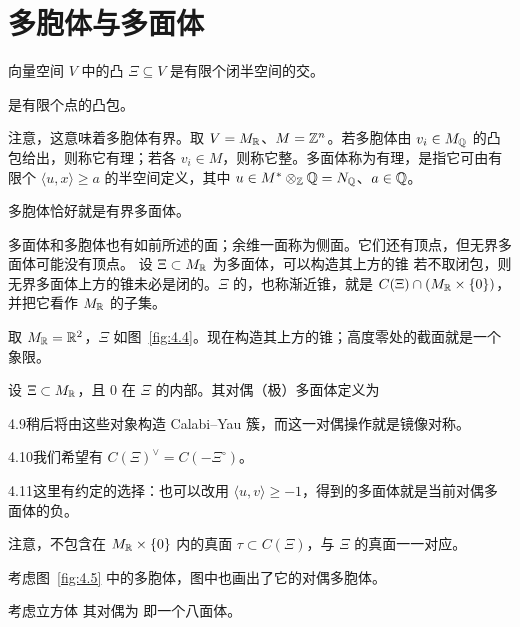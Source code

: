 \section{多胞体与多面体}
\begin{definition}\label{def:4.12}
向量空间 $V$ 中的凸 $\Xi\subseteq V$ 是有限个闭半空间的交。
\end{definition}
\begin{definition}\label{def:4.13}
是有限个点的凸包。
\end{definition}
注意，这意味着多胞体有界。取 $V=M_{\mathbb R}$、$M=\mathbb Z^n$。若多胞体由 $v_i\in M_{\mathbb Q}$ 的凸包给出，则称它有理；若各 $v_i\in M$，则称它整。多面体称为有理，是指它可由有限个 $\langle u,x\rangle\ge a$ 的半空间定义，其中 $u\in M^*\otimes_{\mathbb Z}\mathbb Q=N_{\mathbb Q}$、$a\in\mathbb Q$。
\begin{theorem}\label{thm:4.11}
多胞体恰好就是有界多面体。
\end{theorem}
多面体和多胞体也有如前所述的面；余维一面称为侧面。它们还有顶点，但无界多面体可能没有顶点。
设 $\Xi\subset M_{\mathbb R}$ 为多面体，可以构造其上方的锥
若不取闭包，则无界多面体上方的锥未必是闭的。$\Xi$ 的，也称渐近锥，就是 $C(\Xi)\cap(M_{\mathbb R}\times\{0\})$，并把它看作 $M_{\mathbb R}$ 的子集。
\begin{example}\label{ex:4.21}
取 $M_{\mathbb R}=\mathbb R^2$，$\Xi$ 如图~\ref{fig:4.4}。现在构造其上方的锥；高度零处的截面就是一个象限。
\end{example}
\begin{definition}[对偶多胞体与多面体]\label{def:4.14}
设 $\Xi\subset M_{\mathbb R}$，且 $0$ 在 $\Xi$ 的内部。其对偶（极）多面体定义为
\end{definition}
\begin{Note}{4.9}稍后将由这些对象构造 Calabi–Yau 簇，而这一对偶操作就是镜像对称。\end{Note}
\begin{Note}{4.10}我们希望有 $C(\Xi)^\vee=C(-\Xi^\circ)$。\end{Note}
\begin{Note}{4.11}这里有约定的选择：也可以改用 $\langle u,v\rangle\ge-1$，得到的多面体就是当前对偶多面体的负。\end{Note}
注意，不包含在 $M_{\mathbb R}\times\{0\}$ 内的真面 $\tau\subset C(\Xi)$，与 $\Xi$ 的真面一一对应。
\begin{example}\label{ex:4.22}
考虑图~\ref{fig:4.5} 中的多胞体，图中也画出了它的对偶多胞体。
\end{example}
\begin{example}\label{ex:4.23}
考虑立方体
其对偶为
即一个八面体。
\end{example}

